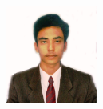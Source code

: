 \documentclass{res} %
\begin{document}
 

				             

\address{\bf  ADDRESS\\1136, Himmat lal ni chali\\Opp. Bnak of Baroda\\Po. Bajwa\\Vadodara\\Gujarat-391310\\}
\address{\bf CONTACT \\ \textbf{Mo.} : +91 7874900739 \\  \textbf{E-m@il}: kunalchavda96@gmail.com}
\begin{figure}
{\includegraphics[width=3cm]{DSCN4570.JPG}}
\end{figure}
\end{document}
